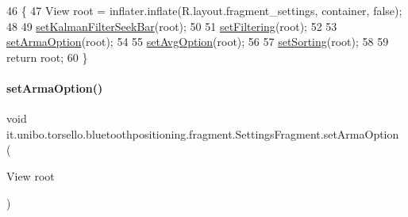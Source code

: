 \begin{DoxyCode}
46                                                                                                       \{
47         View root = inflater.inflate(R.layout.fragment\_settings, container, \textcolor{keyword}{false});
48 
49         \hyperlink{classit_1_1unibo_1_1torsello_1_1bluetoothpositioning_1_1fragment_1_1SettingsFragment_a84057f1633708ec85de5968ed9e7f032_a84057f1633708ec85de5968ed9e7f032}{setKalmanFilterSeekBar}(root);
50 
51         \hyperlink{classit_1_1unibo_1_1torsello_1_1bluetoothpositioning_1_1fragment_1_1SettingsFragment_a0d7b911602439aaf2a9ee4d5f9e41088_a0d7b911602439aaf2a9ee4d5f9e41088}{setFiltering}(root);
52 
53         \hyperlink{classit_1_1unibo_1_1torsello_1_1bluetoothpositioning_1_1fragment_1_1SettingsFragment_a093ab503fb5dc6ddb859b128b614d902_a093ab503fb5dc6ddb859b128b614d902}{setArmaOption}(root);
54 
55         \hyperlink{classit_1_1unibo_1_1torsello_1_1bluetoothpositioning_1_1fragment_1_1SettingsFragment_a0f26c84f3a3dfffabfed1db04303b8b0_a0f26c84f3a3dfffabfed1db04303b8b0}{setAvgOption}(root);
56 
57         \hyperlink{classit_1_1unibo_1_1torsello_1_1bluetoothpositioning_1_1fragment_1_1SettingsFragment_ae29f0b3d6fc60f1ceeab5dcc530166c1_ae29f0b3d6fc60f1ceeab5dcc530166c1}{setSorting}(root);
58 
59         \textcolor{keywordflow}{return} root;
60     \}
\end{DoxyCode}
\hypertarget{classit_1_1unibo_1_1torsello_1_1bluetoothpositioning_1_1fragment_1_1SettingsFragment_a093ab503fb5dc6ddb859b128b614d902_a093ab503fb5dc6ddb859b128b614d902}{}\label{classit_1_1unibo_1_1torsello_1_1bluetoothpositioning_1_1fragment_1_1SettingsFragment_a093ab503fb5dc6ddb859b128b614d902_a093ab503fb5dc6ddb859b128b614d902} 
\paragraph{\texorpdfstring{set\+Arma\+Option()}{setArmaOption()}}
{\footnotesize\ttfamily void it.\+unibo.\+torsello.\+bluetoothpositioning.\+fragment.\+Settings\+Fragment.\+set\+Arma\+Option (\begin{DoxyParamCaption}\item[{View}]{root }\end{DoxyParamCaption})\hspace{0.3cm}{\ttfamily [private]}}


